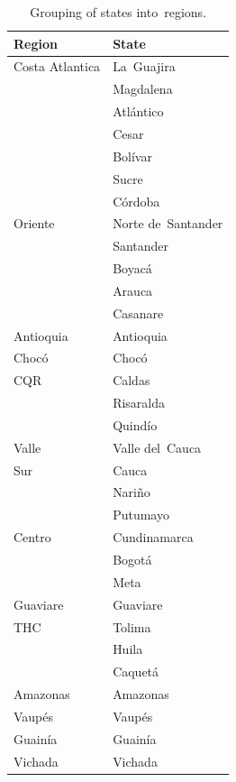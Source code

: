 \documentclass[energies,article,accept,pdftex,moreauthors]{Definitions/mdpi}
\begin{document}
\begin{table}[H] 
\caption{Grouping of states into~regions.\label{tab15}}
\begin{tabularx}{\textwidth}{CC}
\toprule
\textbf{Region}	& \textbf{State}\\
\midrule
Costa Atlantica		& La~Guajira \\
	         	& Magdalena  \\
           	  & Atlántico  \\
                    & Cesar      \\
                    & Bolívar    \\
                    & Sucre      \\
                    & Córdoba    \\
\midrule
Oriente     		& Norte de~Santander \\
	         	& Santander  \\
           	  & Boyacá     \\
                    & Arauca     \\
                    & Casanare   \\
\midrule
Antioquia     		& Antioquia  \\
\midrule
Chocó     		    & Chocó      \\
\midrule
CQR         		& Caldas     \\
	         	& Risaralda  \\
           	  & Quindío    \\
\midrule
Valle     		    & Valle del~Cauca\\
\midrule
Sur          		& Cauca      \\
	         	& Nariño     \\
           	  & Putumayo   \\
\midrule
Centro          	& Cundinamarca \\
	         	& Bogotá     \\
           	  & Meta       \\
\midrule
Guaviare     	    & Guaviare   \\
\midrule
THC             	& Tolima    \\
	         	& Huila      \\
           	  & Caquetá    \\
\midrule
Amazonas     	    & Amazonas   \\
\midrule
Vaupés     	        & Vaupés     \\
\midrule
Guainía     	    & Guainía     \\
\midrule
Vichada     	    & Vichada     \\
\bottomrule
\end{tabularx}
\end{table}
\end{document}
